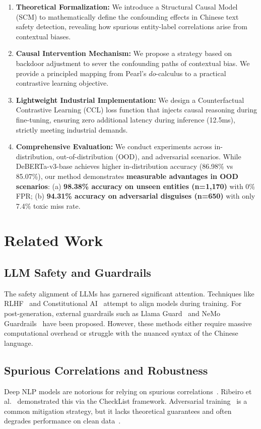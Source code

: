 \documentclass{acmart}
\begin{document}
\begin{enumerate}
\item \textbf{Theoretical Formalization:} We introduce a Structural Causal Model (SCM) to mathematically define the confounding effects in Chinese text safety detection, revealing how spurious entity-label correlations arise from contextual biases.

\item \textbf{Causal Intervention Mechanism:} We propose a strategy based on backdoor adjustment to sever the confounding paths of contextual bias. We provide a principled mapping from Pearl's $do$-calculus to a practical contrastive learning objective.

\item \textbf{Lightweight Industrial Implementation:} We design a Counterfactual Contrastive Learning (CCL) loss function that injects causal reasoning during fine-tuning, ensuring zero additional latency during inference (12.5ms), strictly meeting industrial demands.

\item \textbf{Comprehensive Evaluation:} We conduct experiments across in-distribution, out-of-distribution (OOD), and adversarial scenarios. While DeBERTa-v3-base achieves higher in-distribution accuracy (86.98\% vs 85.07\%), our method demonstrates \textbf{measurable advantages in OOD scenarios}: (a) \textbf{98.38\% accuracy on unseen entities (n=1,170)} with 0\% FPR; (b) \textbf{94.31\% accuracy on adversarial disguises (n=650)} with only 7.4\% toxic miss rate.
\end{enumerate}

\section{Related Work}
\subsection{LLM Safety and Guardrails}
The safety alignment of LLMs has garnered significant attention. Techniques like RLHF~\cite{ouyang2022training} and Constitutional AI~\cite{bai2022constitutional} attempt to align models during training. For post-generation, external guardrails such as Llama Guard~\cite{inan2023llama} and NeMo Guardrails~\cite{rebedea2023nemo} have been proposed. However, these methods either require massive computational overhead or struggle with the nuanced syntax of the Chinese language.

\subsection{Spurious Correlations and Robustness}
Deep NLP models are notorious for relying on spurious correlations~\cite{sagawa2019distributionally}. Ribeiro et al.~\cite{ribeiro2020beyond} demonstrated this via the CheckList framework. Adversarial training~\cite{madry2018towards} is a common mitigation strategy, but it lacks theoretical guarantees and often degrades performance on clean data~\cite{tsipras2019robustness}.
\end{document}
